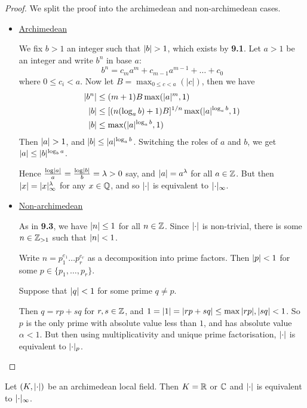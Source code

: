\documentclass[10pt,a4paper]{article}
\begin{document}
\begin{proof}
  We split the proof into the archimedean and non-archimedean cases.

  \begin{itemize}
    \item \underline{Archimedean}

    We fix $b > 1$ an integer such that $\lvert b\rvert > 1$, which exists by \textbf{9.1}. Let $a > 1$ be an integer and write $b^n$ in base $a$:
    \[ b^n = c_ma^m + c_{m-1}a^{m-1} + \ldots + c_0\]
    where $0 \leq c_i < a$. Now let $B = \max_{0\leq c<a}(|c|)$, then we have
    \begin{align*}
      \lvert b^n\rvert &\leq (m+1)B\max(\lvert a\rvert^m ,1)\\
      \lvert b\rvert &\leq [(n(\log_a b)+1)B]^{1/n} \max(\lvert a\rvert^{\log_a b}, 1)\\
      \lvert b\rvert &\leq \max(\lvert a\rvert^{\log_a b}, 1)
    \end{align*}
    Then $\lvert a\rvert > 1$, and $\lvert b\rvert \leq \lvert a\rvert^{\log_a b}$. Switching the roles of $a$ and $b$, we get $\lvert a\rvert \leq \lvert b\rvert^{\log_b a}$.

    Hence $\frac{\log \lvert a\rvert}{a} = \frac{\log \lvert b\rvert}{b} = \lambda > 0$ say, and $\lvert a\rvert = a^\lambda$ for all $a \in \mathbb{Z}$. But then $\lvert x\rvert = \lvert x\rvert_\infty^\lambda$ for any $x \in \mathbb{Q}$, and so $\lvert\cdot\rvert$ is equivalent to $\lvert\cdot\rvert_\infty$.

    \item \underline{Non-archimedean}

    As in \textbf{9.3}, we have $\lvert n\rvert\leq 1$ for all $n \in \mathbb{Z}$. Since $\lvert\cdot\rvert$ is non-trivial, there is some $n \in \mathbb{Z}_{>1}$ such that $\lvert n\rvert < 1$.

    Write $n = p_1^{e_1}\ldots p_r^{e_r}$ as a decomposition into prime factors. Then $\lvert p\rvert <1$ for some $p \in \{p_1, \ldots, p_r\}$.

    Suppose that $\lvert q\rvert < 1$ for some prime $q \neq p$.

    Then $q = rp+sq$ for $r, s \in \mathbb{Z}$, and $1 = \lvert1\rvert = \lvert rp+sq\rvert \leq \max{\lvert rp\rvert, \lvert sq\rvert} < 1$. So $p$ is the only prime with absolute value less than $1$, and has absolute value $\alpha < 1$. But then using multiplicativity and unique prime factorisation, $\lvert\cdot\rvert$ is equivalent to $\lvert\cdot\rvert_p$.
  \end{itemize}
\end{proof}
\begin{theorem}
  Let $(K, \lvert\cdot\rvert)$ be an archimedean local field. Then $K = \mathbb{R}$ or $\mathbb{C}$ and $\lvert\cdot\rvert$ is equivalent to $\lvert\cdot\rvert_\infty$.
\end{theorem}
\end{document}
